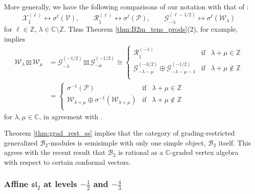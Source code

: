 \documentclass[11pt, reqno]{amsart}
\theoremstyle{definition}\newtheorem{defi}[thm]{Definition}
\theoremstyle{definition}\newtheorem{rem}[thm]{Remark}
\theoremstyle{definition}\newtheorem{exam}[thm]{Example}
\theoremstyle{definition}\newtheorem{assum}[thm]{Assumption}
\newcommand{\cB}{\mathcal{B}}
\newcommand{\cV}{\mathcal{V}}
\newcommand{\cR}{\mathcal{R}}
\newcommand{\cX}{\mathcal{X}}
\newcommand{\cP}{\mathcal{P}}
\newcommand{\cG}{\mathcal{G}}
\newcommand{\cW}{\mathcal{W}}
\newcommand{\CC}{\mathbb{C}}
\newcommand{\ZZ}{\mathbb{Z}}
\newcommand{\tens}{\boxtimes}
\begin{document}
More generally, we have the following comparisons of our notation with that of \cite{AW}:
\begin{equation*}
\cX_{\overline{1}}^{(\ell)} \longleftrightarrow \sigma^\ell(\cV),\qquad \cR_{\overline{1}}^{(\ell)} \longleftrightarrow \sigma^\ell(\cP),\qquad\cG_{\overline{-\lambda}}^{(\ell-1/2)}\longleftrightarrow\sigma^\ell(\cW_\lambda)
\end{equation*}
for $\ell\in\ZZ$, $\lambda\in\CC\setminus\ZZ$. Thus Theorem \ref{thm:B2m_tens_prods}(2), for example, implies
\begin{align*}
\cW_\lambda\tens\cW_\mu & =\cG^{(-1/2)}_{\overline{-\lambda}}\tens\cG^{(-1/2)}_{\overline{-\mu}}\cong \left\lbrace\begin{array}{lll}
\cR_{\overline{1}}^{(-1)} & \text{if} & \lambda+\mu\in\ZZ\\
\cG_{\overline{-\lambda-\mu}}^{(-3/2)} \oplus \cG_{\overline{-\lambda-\mu-1}}^{(-1/2)} & \text{if} & \lambda+\mu\notin\ZZ\\
\end{array} \right.\nonumber\\
& = \left\lbrace\begin{array}{lll}
\sigma^{-1}(\cP) & \text{if} & \lambda+\mu\in\ZZ\\
\cW_{\lambda+\mu} \oplus \sigma^{-1}(\cW_{\lambda+\mu}) & \text{if} & \lambda+\mu\notin\ZZ\\
\end{array} \right. 
\end{align*}
for $\lambda,\mu\in\CC$, in agreement with \cite[Equation 6.5]{AW}.

Theorem \ref{thm:grad_rest_ss} implies that the category of grading-restricted generalized $\cB_2$-modules is semisimple with only one simple object, $\cB_2$ itself. This agrees with the recent result \cite[Theorem 55]{BBOPY} that $\cB_2$ is rational as a $\CC$-graded vertex algebra with respect to certain conformal vectors.

\subsubsection{Affine \texorpdfstring{$\mathfrak{sl}_2$}{sl(2)} at levels \texorpdfstring{$-\frac{1}{2}$}{-1/2} and \texorpdfstring{$-\frac{4}{3}$}{-4/3}}
\end{document}
